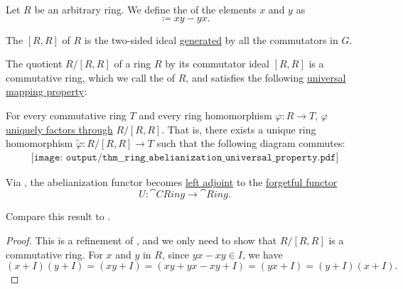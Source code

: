 \begin{definition}\label{def:ring_commutator}
  Let \( R \) be an arbitrary ring. We define the  of the elements \( x \) and \( y \) as
  \begin{equation*}
    [x, y] \coloneqq xy - yx.
  \end{equation*}

  The  \( [R, R] \) of \( R \) is the two-sided ideal \hyperref[def:generated_ring_ideal]{generated} by all the commutators in \( G \).
\end{definition}

\begin{proposition}\label{thm:ring_abelianization_universal_property}
  The quotient \( R / [R, R] \) of a ring \( R \) by its commutator ideal \( [R, R] \) is a commutative ring, which we call the  of \( R \), and satisfies the following \hyperref[rem:universal_mapping_property]{universal mapping property}:
  \begin{displayquote}
    For every commutative ring \( T \) and every ring homomorphism \( \varphi: R \to T \), \( \varphi \) \hyperref[def:factors_through]{uniquely factors through} \( R / [R, R] \). That is, there exists a unique ring homomorphism \( \widetilde{\varphi}: R / [R, R] \to T \) such that the following diagram commutes:
    \begin{equation}\label{eq:thm:ring_abelianization_universal_property/diagram}
      \begin{aligned}
        \texttt{[image: output/thm\_\_ring\_abelianization\_universal\_property.pdf]}
      \end{aligned}
    \end{equation}
  \end{displayquote}

  Via , the abelianization functor becomes \hyperref[def:category_adjunction]{left adjoint} to the \hyperref[def:concrete_category]{forgetful functor}
  \begin{equation*}
    U: \cat{CRing} \to \cat{Ring}.
  \end{equation*}

  Compare this result to .
\end{proposition}
\begin{proof}
  This is a refinement of , and we only need to show that \( R / [R, R] \) is a commutative ring. For \( x \) and \( y \) in \( R \), since \( yx - xy \in I \), we have
  \begin{equation*}
    (x + I) (y + I)
    =
    (xy + I)
    =
    (xy + yx - xy + I)
    =
    (yx + I)
    =
    (y + I) (x + I).
  \end{equation*}
\end{proof}

